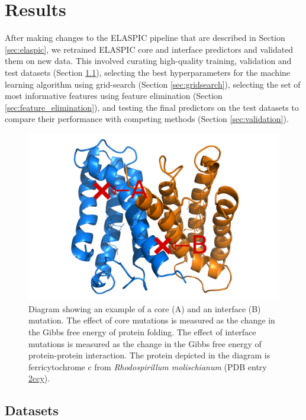 
\chapter{Results} \label{ch:results}

After making changes to the ELASPIC pipeline that are described in Section \ref{sec:elaspic}, we retrained ELASPIC core and interface predictors and validated them on new data. This involved curating high-quality training, validation and test datasets (Section \ref{sec:datasets}), selecting the best hyperparameters for the machine learning algorithm using grid-search (Section \ref{sec:gridsearch}), selecting the set of most informative features using feature elimination (Section \ref{sec:feature_elimination}), and testing the final predictors on the test datasets to compare their performance with competing methods (Section \ref{sec:validation}).

\begin{figure}[t]
	\centering
	\includegraphics[width=0.8\linewidth]{static/elaspic/core_vs_interface_final.png}
	\caption[Example of a core and interface mutation.]{Diagram showing an example of a core (A) and an interface (B) mutation. The effect of core mutations is measured as the change in the Gibbs free energy of protein folding. The effect of interface mutations is measured as the change in the Gibbs free energy of protein-protein interaction. The protein depicted in the diagram is ferricytochrome c from \textit{Rhodospirillum molischianum} (PDB entry \url{2ccy}).}
	\label{fig:core_vs_interface}
\end{figure}


\section{Datasets} \label{sec:datasets}


